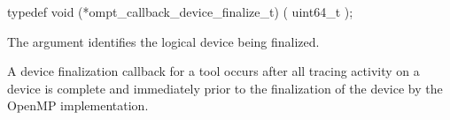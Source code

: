 \format

\begin{ccppspecific}
\begin{omptCallback}
typedef void (*ompt_callback_device_finalize_t) (
  uint64_t 
);
\end{omptCallback}
\end{ccppspecific}


\argdesc

The argument  identifies the logical device
being finalized.

\descr 

A device finalization callback for a tool occurs after all tracing activity 
on a device is complete and immediately prior to the finalization of the device by the OpenMP implementation.





